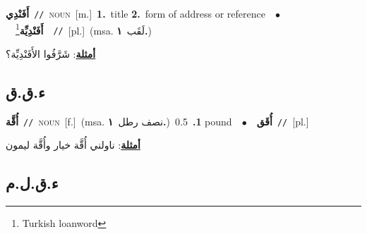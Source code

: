 \documentclass[10pt,a4paper,twoside]{article} %
\begin{document}
\begin{multicols}{2}
{\setlength\topsep{0pt}\textbf{\foreignlanguage{arabic}{أَفَنْدِي}}\ {\color{gray}\texttt{//}\color{black}}\ \textsc{noun}\ [m.]\ \textbf{1.}~title  \textbf{2.}~form of address or reference\ \ $\bullet$\ \ \setlength\topsep{0pt}\textbf{\foreignlanguage{arabic}{أَفَنْدِيِّة}}\footnote{Turkish loanword}\ \ {\color{gray}\texttt{//}\color{black}}\ [pl.]\ \color{gray}(msa. \foreignlanguage{arabic}{لَقَب}~\foreignlanguage{arabic}{\textbf{١.}})\color{black}\  \begin{flushright}\color{gray}\foreignlanguage{arabic}{\textbf{\underline{\foreignlanguage{arabic}{أمثلة}}}: شَرَّفُوا الأَفَنْدِيِّة؟}\end{flushright}\color{black}} \vspace{2mm}

\vspace{-3mm}
\subsection*{\color{blue}\foreignlanguage{arabic}{ء.ق.ق}\color{blue}{}} 

{\setlength\topsep{0pt}\textbf{\foreignlanguage{arabic}{أُقَّة}}\ {\color{gray}\texttt{//}\color{black}}\ \textsc{noun}\ [f.]\ \color{gray}(msa. \foreignlanguage{arabic}{نصف رطل}~\foreignlanguage{arabic}{\textbf{١.}})\color{black}\ \textbf{1.}~0.5 pound\ \ $\bullet$\ \ \setlength\topsep{0pt}\textbf{\foreignlanguage{arabic}{أُقَق}}\ {\color{gray}\texttt{//}\color{black}}\ [pl.]\  \begin{flushright}\color{gray}\foreignlanguage{arabic}{\textbf{\underline{\foreignlanguage{arabic}{أمثلة}}}: ناولني أُقَّة خيار وأُقَّة ليمون}\end{flushright}\color{black}} \vspace{2mm}

\vspace{-3mm}
\subsection*{\color{blue}\foreignlanguage{arabic}{ء.ق.ل.م}\color{blue}{}} 


\end{multicols}
\end{document}
